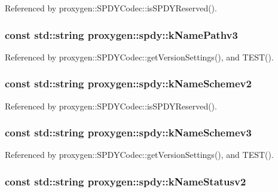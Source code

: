 Referenced by proxygen\+::\+S\+P\+D\+Y\+Codec\+::is\+S\+P\+D\+Y\+Reserved().

\subsubsection[{k\+Name\+Pathv3}]{\setlength{\rightskip}{0pt plus 5cm}const std\+::string proxygen\+::spdy\+::k\+Name\+Pathv3}\label{namespaceproxygen_1_1spdy_ab2189897a69579cc967e976fdad061a6}


Referenced by proxygen\+::\+S\+P\+D\+Y\+Codec\+::get\+Version\+Settings(), and T\+E\+S\+T().

\subsubsection[{k\+Name\+Schemev2}]{\setlength{\rightskip}{0pt plus 5cm}const std\+::string proxygen\+::spdy\+::k\+Name\+Schemev2}\label{namespaceproxygen_1_1spdy_a7285235fc8ee77fe459478d13b65308e}


Referenced by proxygen\+::\+S\+P\+D\+Y\+Codec\+::is\+S\+P\+D\+Y\+Reserved().

\subsubsection[{k\+Name\+Schemev3}]{\setlength{\rightskip}{0pt plus 5cm}const std\+::string proxygen\+::spdy\+::k\+Name\+Schemev3}\label{namespaceproxygen_1_1spdy_ad74bdfff696d9e55ba98cba711ba537a}


Referenced by proxygen\+::\+S\+P\+D\+Y\+Codec\+::get\+Version\+Settings(), and T\+E\+S\+T().

\subsubsection[{k\+Name\+Statusv2}]{\setlength{\rightskip}{0pt plus 5cm}const std\+::string proxygen\+::spdy\+::k\+Name\+Statusv2}\label{namespaceproxygen_1_1spdy_a4b4637bbac5bd414ad2041e46e746e00}


